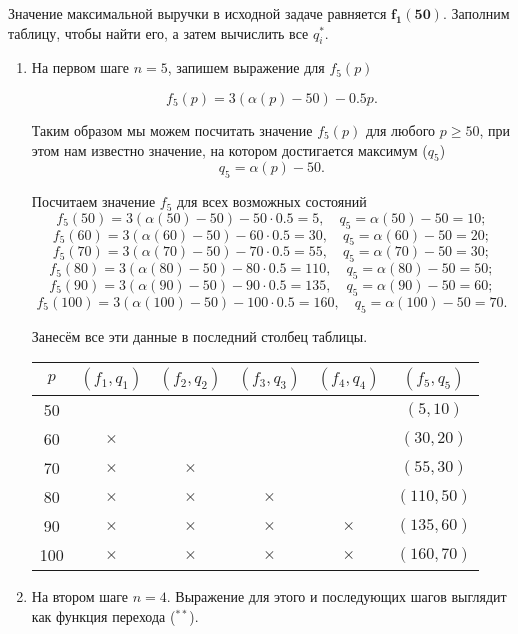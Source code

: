 Значение максимальной выручки в исходной задаче равняется $\mathbf {f_1(50)}$. Заполним таблицу, чтобы найти его, а затем вычислить все $q^*_i$.

\bigskip

\begin{enumerate}
	\item[\fbox{\textbf{Шаг 1}}] На первом шаге $n = 5$, запишем выражение для $f_5(p)$
	
	\[
	f_5(p) = 3(\alpha(p) - 50) - 0.5p.
	\]
	
	Таким образом мы можем посчитать значение $f_5(p)$ для любого $p \ge 50$, при этом нам известно значение, на котором достигается максимум ($q_5$)
	\[
	q_5 = \alpha(p) - 50.
	\]
	
	Посчитаем значение $f_5$ для всех возможных состояний
	\[
	f_5(50) = 3(\alpha(50) - 50) - 50\cdot0.5 = 5, \quad q_5 = \alpha(50) - 50 = 10;
	\]
	\[
	f_5(60) = 3(\alpha(60) - 50) - 60\cdot0.5 = 30, \quad q_5 = \alpha(60) - 50 = 20;
	\]
	\[
	f_5(70) = 3(\alpha(70) - 50) - 70\cdot0.5 = 55, \quad q_5 = \alpha(70) - 50 = 30;
	\]
	\[
	f_5(80) = 3(\alpha(80) - 50) - 80\cdot0.5 = 110, \quad q_5 = \alpha(80) - 50 = 50;
	\]
	\[
	f_5(90) = 3(\alpha(90) - 50) - 90\cdot0.5 = 135, \quad q_5 = \alpha(90) - 50 = 60;
	\]
	\[
	f_5(100) = 3(\alpha(100) - 50) - 100\cdot0.5 = 160, \quad q_5 = \alpha(100) - 50 = 70.
	\]
	
	Занесём все эти данные в последний столбец таблицы.
	
	\begin{table}[H]
		\centering
		\begin{tabular}{ | c | c | c | c | c | c | } 
			\hline
			$p$ & $(f_1, q_1)$ & $(f_2, q_2)$ & $(f_3, q_3)$ & $(f_4, q_4)$ & $(f_5, q_5)$ \\ 
			\hline
			50 & & & & & $(5, 10)$ \\\hline
			60 & $\times$ & & & & $(30, 20)$ \\\hline
			70 & $\times$ & $\times$ & & & $(55, 30)$ \\\hline
			80 & $\times$ & $\times$ & $\times$ & & $(110, 50)$ \\\hline
			90 & $\times$ & $\times$ & $\times$ & $\times$ & $(135, 60)$ \\\hline
			100 & $\times$ & $\times$ & $\times$ & $\times$ & $(160, 70)$ \\\hline
		\end{tabular}
	\end{table}
	
	\item[\fbox{\textbf{Шаг 2}}] На втором шаге $n = 4$. Выражение для этого и последующих шагов выглядит как функция перехода ($^{**}$).
	

\end{enumerate}

